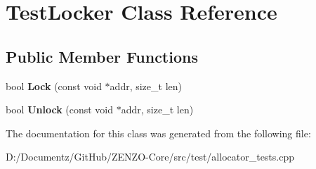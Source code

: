 \hypertarget{class_test_locker}{}\section{Test\+Locker Class Reference}
\label{class_test_locker}
\subsection*{Public Member Functions}
\begin{DoxyCompactItemize}
\item 
\mbox{\label{class_test_locker_a3fe641f059dbad71492bf67803c48942}} 
bool {\bfseries Lock} (const void $\ast$addr, size\+\_\+t len)
\item 
\mbox{\label{class_test_locker_a2dd93706bf6e42cdda57bbab0a88893b}} 
bool {\bfseries Unlock} (const void $\ast$addr, size\+\_\+t len)
\end{DoxyCompactItemize}


The documentation for this class was generated from the following file\+:\begin{DoxyCompactItemize}
\item 
D\+:/\+Documentz/\+Git\+Hub/\+Z\+E\+N\+Z\+O-\/\+Core/src/test/allocator\+\_\+tests.\+cpp\end{DoxyCompactItemize}
